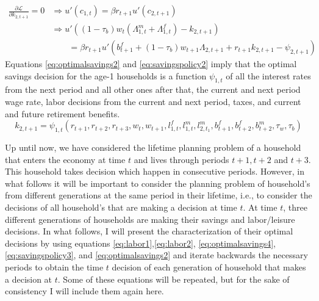 \documentclass[ProjectUYA]{subfiles}
\begin{document}
\begin{equation}
	\label{eq:optimalsavings2}
	\begin{aligned}
		\frac{\partial\mathcal{L}}{\partial k_{2,t+1}}=0 & \Rightarrow u'(c_{1,t})=\beta r_{t+1}
		u'(c_{2,t+1}) \\
		&\Rightarrow u'\left((1-\tau_b)w_t (\Lambda_{1,t}^m+\Lambda_{1,t}^f) -k_{2,t+1}\right) \\
		&\qquad = \beta r_{t+1}
		u'\left(b_{t+1}^f+(1-\tau_b)w_{t+1} \Lambda_{2,t+1} + r_{t+1}k_{2,t+1} -\psi_{2,t+1}\right)
\end{aligned}
\end{equation}
Equations \eqref{eq:optimalsavings2} and \eqref{eq:savingspolicy2} imply that the optimal savings decision for 
the age-1 households is a function $\psi_{1,t}$ of all the interest rates from the next period and all other ones after that, the current and next period wage rate, labor decisions from the current and next period, taxes, and current and future retirement benefits. 
\begin{equation}
 	\label{eq:savingspolicy1}
 	k_{2,t+1}= \psi_{1,t} (r_{t+1},r_{t+2},r_{t+3},w_t,w_{t+1},l_{1,t}^f,l_{1,t}^m,l_{2,t_1}^m, b_{t+1}^f,b_{t+2}^f,b_{t+2}^m, \tau_w,\tau_b)
 \end{equation} 

 Up until now, we have considered the lifetime planning problem of a household that enters the economy at time $t$ and lives through periods $t+1,t+2$ and $t+3.$ This household takes decision which happen in consecutive periods. However, in what follows it will be important to consider the planning problem of household's from different generations at the same period in their lifetime, i.e., to consider the decisions of all household's that are making a decision at time $t.$ At time $t$, three different generations of households are making their savings and labor/leisure decisions. In what follows, I will present the characterization of their optimal decisions by using equations \eqref{eq:labor1},\eqref{eq:labor2}, \eqref{eq:optimalsavings4},\eqref{eq:savingspolicy3}, and \eqref{eq:optimalsavings2} and iterate backwards the necessary periods to obtain the time $t$ decision of each generation of household that makes a decision at $t.$ Some of these equations will be repeated, but for the sake of consistency I will include them again here. 
\end{document}
